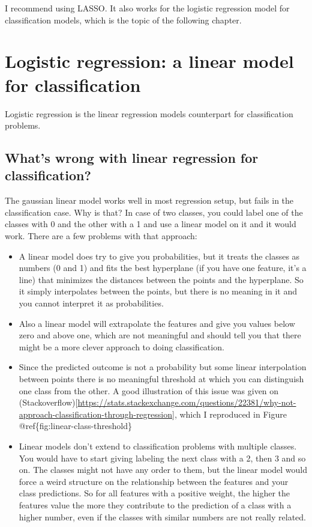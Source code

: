 \documentclass[12pt,]{krantz}
\providecommand{\tightlist}{%
  \setlength{\itemsep}{0pt}\setlength{\parskip}{0pt}}
\theoremstyle{definition}
\theoremstyle{definition}
\theoremstyle{definition}
\theoremstyle{remark}
\begin{document}
I recommend using LASSO. It also works for the logistic regression model
for classification models, which is the topic of the following chapter.

\section{Logistic regression: a linear model for
classification}\label{logistic-regression-a-linear-model-for-classification}

Logistic regression is the linear regression models counterpart for
classification problems.

\subsection{What's wrong with linear regression for
classification?}\label{whats-wrong-with-linear-regression-for-classification}

The gaussian linear model works well in most regression setup, but fails
in the classification case. Why is that? In case of two classes, you
could label one of the classes with 0 and the other with a 1 and use a
linear model on it and it would work. There are a few problems with that
approach:

\begin{itemize}
\tightlist
\item
  A linear model does try to give you probabilities, but it treats the
  classes as numbers (0 and 1) and fits the best hyperplane (if you have
  one feature, it's a line) that minimizes the distances between the
  points and the hyperplane. So it simply interpolates between the
  points, but there is no meaning in it and you cannot interpret it as
  probabilities.
\item
  Also a linear model will extrapolate the features and give you values
  below zero and above one, which are not meaningful and should tell you
  that there might be a more clever approach to doing classification.
\item
  Since the predicted outcome is not a probability but some linear
  interpolation between points there is no meaningful threshold at which
  you can distinguish one class from the other. A good illustration of
  this issue was given on
  (Stackoverflow){[}\url{https://stats.stackexchange.com/questions/22381/why-not-approach-classification-through-regression}{]},
  which I reproduced in Figure @ref\{fig:linear-class-threshold\}
\item
  Linear models don't extend to classification problems with multiple
  classes. You would have to start giving labeling the next class with a
  2, then 3 and so on. The classes might not have any order to them, but
  the linear model would force a weird structure on the relationship
  between the features and your class predictions. So for all features
  with a positive weight, the higher the features value the more they
  contribute to the prediction of a class with a higher number, even if
  the classes with similar numbers are not really related.
\end{itemize}
\end{document}
